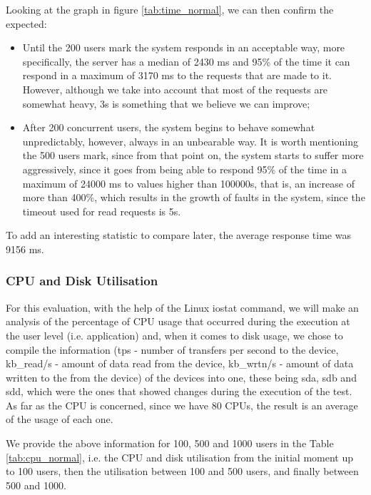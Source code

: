   \newpage
  
  Looking at the graph in figure \ref{tab:time_normal}, we can then confirm the expected: 
  
  \begin{itemize}
      \item Until the 200 users mark the system responds in an acceptable way, more specifically, the server has a median of 2430 ms and 95\% of the time it can respond in a maximum of 3170 ms to the requests that are made to it. However, although we take into account that most of the requests are somewhat heavy, 3s is something that we believe we can improve;
      \item After 200 concurrent users, the system begins to behave somewhat unpredictably, however, always in an unbearable way. It is worth mentioning the 500 users mark, since from that point on, the system starts to suffer more aggressively, since it goes from being able to respond 95\% of the time in a maximum of 24000 ms to values higher than 100000s, that is, an increase of more than 400\%, which results in the growth of faults in the system, since the timeout used for read requests is 5s.
  \end{itemize}
  
 To add an interesting statistic to compare later, the average response time was 9156 ms.
  
  \subsubsection{CPU and Disk Utilisation}
  
  For this evaluation, with the help of the Linux iostat command, we will make an analysis of the percentage of CPU usage that occurred during the execution at the user level (i.e. application) and, when it comes to disk usage, we chose to compile the information (tps - number of transfers per second to the device,  kb\_read/s - amount of data read from the device, kb\_wrtn/s - amount of data written to the from the device) of the devices into one, these being sda, sdb and sdd, which were the ones that showed changes during the execution of the test. As far as the CPU is concerned, since we have 80 CPUs, the result is an average of the usage of each one.
  
  We provide the above information for 100, 500 and 1000 users in the Table \ref{tab:cpu_normal}, i.e. the CPU and disk utilisation from the initial moment up to 100 users, then the utilisation between 100 and 500 users, and finally between 500 and 1000.
 
